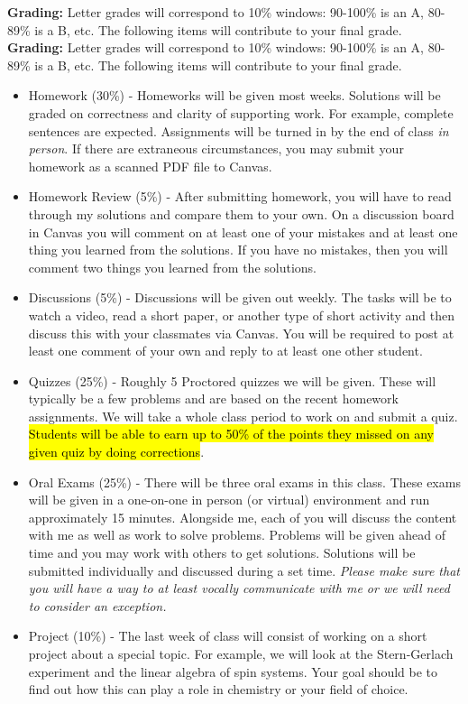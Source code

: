 \documentclass[12pt]{amsbook}
\begin{document}
\textbf{Grading:} Letter grades will correspond to 10\% windows: 90-100\% is an A, 80-89\% is a B, etc. The following items will contribute to your final grade.
\textbf{Grading:} Letter grades will correspond to 10\% windows: 90-100\% is an A, 80-89\% is a B, etc. The following items will contribute to your final grade.
\begin{itemize}
\item Homework (30\%) - Homeworks will be given most weeks. Solutions will be graded on correctness and clarity of supporting work. For example, complete sentences are expected. Assignments will be turned in by the end of class \emph{in person}. If there are extraneous circumstances, you may submit your homework as a scanned PDF file to Canvas.
\item Homework Review (5\%) - After submitting homework, you will have to read through my solutions and compare them to your own. On a discussion board in Canvas you will comment on at least one of your mistakes and at least one thing you learned from the solutions. If you have no mistakes, then you will comment two things you learned from the solutions.
\item Discussions (5\%) - Discussions will be given out weekly. The tasks will be to watch a video, read a short paper, or another type of short activity and then discuss this with your classmates via Canvas. You will be required to post at least one comment of your own and reply to at least one other student.
\item Quizzes (25\%) -  Roughly 5 Proctored quizzes we will be given.  These will typically be a few problems and are based on the recent homework assignments. We will take a whole class period to work on and submit a quiz. \hl{Students will be able to earn up to 50\% of the points they missed on any given quiz by doing corrections}.
\item Oral Exams (25\%) - There will be three oral exams in this class. These exams will be given in a one-on-one in person (or virtual) environment and run approximately 15 minutes.  Alongside me, each of you will discuss the content with me as well as work to solve problems. Problems will be given ahead of time and you may work with others to get solutions.  Solutions will be submitted individually and discussed during a set time. \emph{Please make sure that you will have a way to at least vocally communicate with me or we will need to consider an exception.}
\item Project (10\%) - The last week of class will consist of working on a short project about a special topic.  For example, we will look at the Stern-Gerlach experiment and the linear algebra of spin systems. Your goal should be to find out how this can play a role in chemistry or your field of choice.
\end{itemize}
\end{document}
